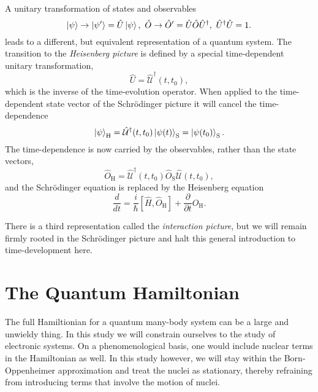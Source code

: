     A unitary transformation of states and observables
    \begin{equation}
        \ket{\psi} \to \ket{\psi'} = \hat{U}\ket{\psi}, \ 
        \hat{O} \to \hat{O}' = \hat{U}\hat{O}\hat{U}^\dagger, \ 
        \hat{U}^\dagger\hat{U} = 1.
    \end{equation}
    leads to a different, but equivalent representation of a quantum system.
    The transition to the \emph{Heisenberg picture} is defined by a special
    time-dependent unitary transformation,
    \begin{equation}
        \hat{U} = \hat{\mathcal{U}}^\dagger(t, t_0),
    \end{equation}
    which is the inverse of the time-evolution operator. When applied to the 
    time-dependent state vector of the Schrödinger picture it will cancel 
    the time-dependence
    \begin{equation}
        \ket{\psi}_\text{H} 
        = \hat{\mathcal{U}}^\dagger(t, t_0) \ket{\psi(t)}_\text{S}
        = \ket{\psi(t_0)}_\text{S}.
    \end{equation}
    The time-dependence is now carried by the observables, rather than the state 
    vectors,
    \begin{equation}
        \hat{O}_\text{H} 
        = \hat{\mathcal{U}}^\dagger(t, t_0)
        \hat{O}_\text{S}
        \hat{\mathcal{U}}(t, t_0),
    \end{equation}
    and the Schrödinger equation is replaced by the Heisenberg equation
    \begin{equation}
        \frac{d}{dt} 
        = \frac{i}{\hbar}[\hat{H}, \hat{O}_\text{H}]
        + \frac{\partial}{\partial t} \hat{O}_\text{H}.
    \end{equation}

    There is a third representation called the \emph{interaction picture}, but we will 
    remain firmly rooted in the Schrödinger picture and halt this general introduction 
    to time-development here. 

\section{The Quantum Hamiltonian}

    The full Hamiltionian for a quantum many-body system can be a large 
    and unwieldy thing. In this study we will constrain ourselves to the study of
    electronic systems. On a phenomenological basis, one would include nuclear
    terms in the Hamiltonian as well. In this study however, we will stay within the
    Born-Oppenheimer approximation and treat the nuclei as stationary, thereby
    refraining from introducing terms that involve the motion of nuclei.

